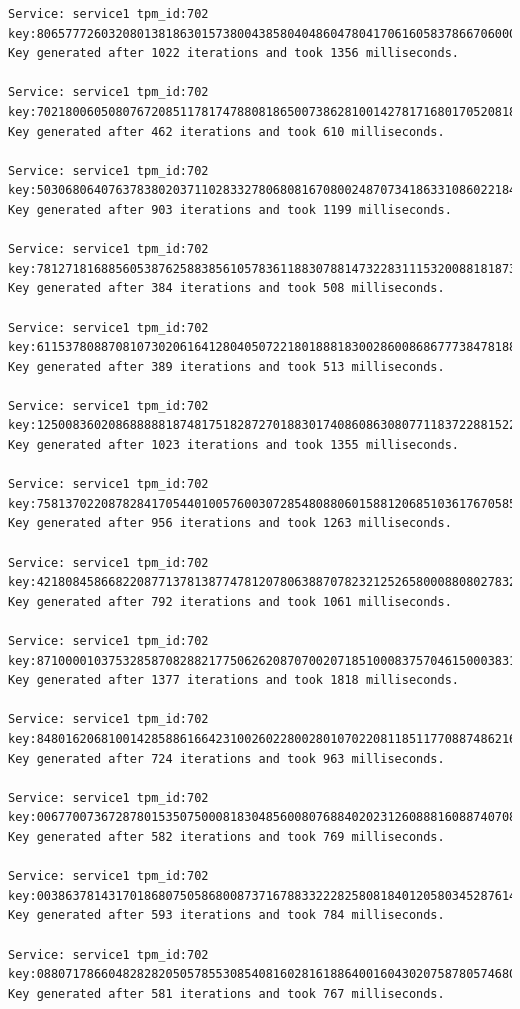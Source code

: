 \begin{lstlisting}
Service: service1 tpm_id:702 key:806577726032080138186301573800438580404860478041706160583786670600078581
Key generated after 1022 iterations and took 1356 milliseconds.

Service: service1 tpm_id:702 key:702180060508076720851178174788081865007386281001427817168017052081854782
Key generated after 462 iterations and took 610 milliseconds.

Service: service1 tpm_id:702 key:503068064076378380203711028332780680816708002487073418633108602218478831
Key generated after 903 iterations and took 1199 milliseconds.

Service: service1 tpm_id:702 key:781271816885605387625883856105783611883078814732283111532008818187333400
Key generated after 384 iterations and took 508 milliseconds.

Service: service1 tpm_id:702 key:611537808870810730206164128040507221801888183002860086867773847818878187
Key generated after 389 iterations and took 513 milliseconds.

Service: service1 tpm_id:702 key:125008360208688888187481751828727018830174086086308077118372288152205006
Key generated after 1023 iterations and took 1355 milliseconds.

Service: service1 tpm_id:702 key:758137022087828417054401005760030728548088060158812068510361767058585170
Key generated after 956 iterations and took 1263 milliseconds.

Service: service1 tpm_id:702 key:421808458668220877137813877478120780638870782321252658000880802783200008
Key generated after 792 iterations and took 1061 milliseconds.

Service: service1 tpm_id:702 key:871000010375328587082882177506262087070020718510008375704615000383101016
Key generated after 1377 iterations and took 1818 milliseconds.

Service: service1 tpm_id:702 key:848016206810014285886166423100260228002801070220811851177088748621670808
Key generated after 724 iterations and took 963 milliseconds.

Service: service1 tpm_id:702 key:006770073672878015350750008183048560080768840202312608881608874070885067
Key generated after 582 iterations and took 769 milliseconds.

Service: service1 tpm_id:702 key:003863781431701868075058680087371678833222825808184012058034528761407028
Key generated after 593 iterations and took 784 milliseconds.

Service: service1 tpm_id:702 key:088071786604828282050578553085408160281618864001604302075878057468086488
Key generated after 581 iterations and took 767 milliseconds.


\end{lstlisting}
